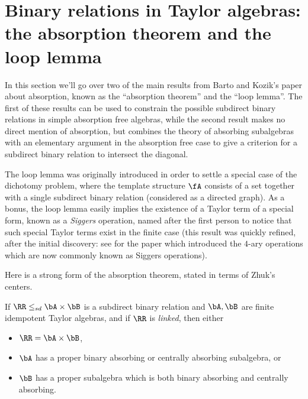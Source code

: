 


\section{Binary relations in Taylor algebras: the absorption theorem and the loop lemma}

In this section we'll go over two of the main results from Barto and Kozik's paper \cite{cyclic} about absorption, known as the ``absorption theorem'' and the ``loop lemma''. The first of these results can be used to constrain the possible subdirect binary relations in simple absorption free algebras, while the second result makes no direct mention of absorption, but combines the theory of absorbing subalgebras with an elementary argument in the absorption free case to give a criterion for a subdirect binary relation to intersect the diagonal.

The loop lemma was originally introduced in order to settle a special case of the dichotomy problem, where the template structure $\fA$ consists of a set together with a single subdirect binary relation (considered as a directed graph). As a bonus, the loop lemma easily implies the existence of a Taylor term of a special form, known as a \emph{Siggers} operation, named after the first person to notice that such special Taylor terms exist in the finite case \cite{siggers-original} (this result was quickly refined, after the initial discovery: see \cite{optimal-taylor} for the paper which introduced the $4$-ary operations which are now commonly known as Siggers operations).

Here is a strong form of the absorption theorem, stated in terms of Zhuk's centers.

\begin{thm}\label{absorption-theorem} If $\RR \le_{sd} \bA \times \bB$ is a subdirect binary relation and $\bA,\bB$ are finite idempotent Taylor algebras, and if $\RR$ is \emph{linked}, then either
\begin{itemize}
\item $\RR = \bA \times \bB$,
\item $\bA$ has a proper binary absorbing or centrally absorbing subalgebra, or
\item $\bB$ has a proper subalgebra which is both binary absorbing and centrally absorbing.
\end{itemize}
\end{thm}


